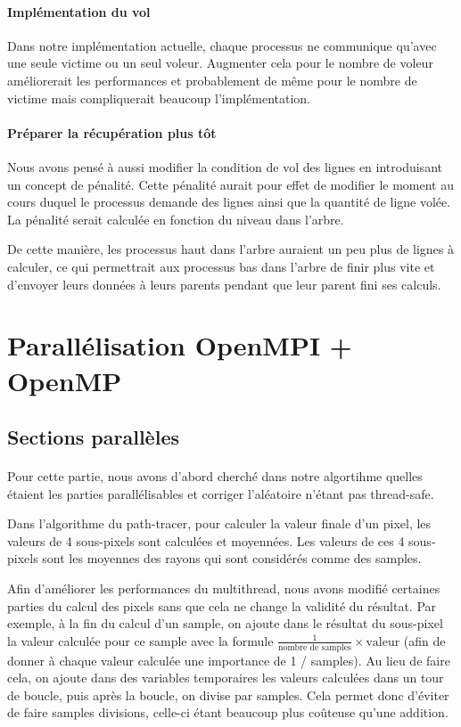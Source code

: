 \documentclass{article}
\begin{document}
\paragraph{Impl\'ementation du vol}
Dans notre impl\'ementation actuelle, chaque processus ne communique qu'avec une seule victime ou un seul voleur. 
Augmenter cela pour le nombre de voleur am\'eliorerait les performances et probablement de m\^eme pour le nombre de victime mais
compliquerait beaucoup l'impl\'ementation.

\paragraph{Pr\'eparer la r\'ecup\'eration plus t\^ot}
Nous avons pens\'e \`a aussi modifier la condition de vol des lignes en introduisant un concept de p\'enalit\'e.
Cette p\'enalit\'e aurait pour effet de modifier le moment au cours duquel le processus demande des lignes ainsi que la quantit\'e de ligne vol\'ee.
La p\'enalit\'e serait calcul\'ee en fonction du niveau dans l'arbre. 

De cette mani\`ere, les processus haut dans l'arbre auraient un peu plus de lignes \`a calculer, ce qui permettrait aux processus 
bas dans l'arbre de finir plus vite et d'envoyer leurs donn\'ees \`a leurs parents pendant que leur parent fini ses calculs.

\newpage

\section{Parall\'elisation OpenMPI + OpenMP}

\subsection{Sections parall\`eles}
\paragraph{}
Pour cette partie, nous avons d'abord cherch\'e dans notre algortihme quelles \'etaient les parties parall\'elisables et 
corriger l'al\'eatoire n'\'etant pas thread-safe. 

Dans l'algorithme du path-tracer, pour calculer la valeur finale d'un pixel, les valeurs de 4 sous-pixels sont calcul\'ees et moyenn\'ees. 
Les valeurs de ces 4 sous-pixels sont les moyennes des rayons qui sont consid\'er\'es comme des samples.

Afin d'am\'eliorer les performances du multithread, nous avons modifié certaines parties du calcul des pixels sans que cela ne change la validité du résultat.
Par exemple, \`a la fin du calcul d'un sample, on ajoute dans le r\'esultat du sous-pixel la valeur calcul\'ee pour ce sample avec la formule $\frac{1}{\text{nombre de samples}} \times \text{valeur}$ (afin de donner à chaque valeur calculée une importance de 1 / samples). Au lieu de faire cela, on ajoute dans des variables temporaires les valeurs calcul\'ees dans un tour de boucle, puis apr\`es la boucle, on divise par samples.
Cela permet donc d'\'eviter de faire samples divisions, celle-ci étant beaucoup plus co\^uteuse qu'une addition.
\end{document}
